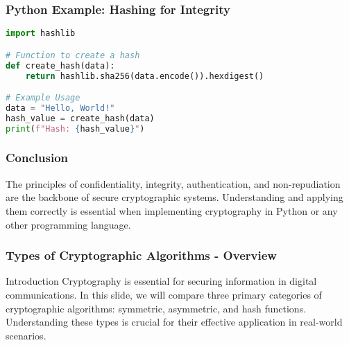 \documentclass{beamer}
\begin{document}
\begin{frame}[fragile]
    \frametitle{Python Example: Hashing for Integrity}
    \begin{lstlisting}[language=Python]
import hashlib

# Function to create a hash
def create_hash(data):
    return hashlib.sha256(data.encode()).hexdigest()

# Example Usage
data = "Hello, World!"
hash_value = create_hash(data)
print(f"Hash: {hash_value}")
    \end{lstlisting}
\end{frame}

\begin{frame}
    \frametitle{Conclusion}
    The principles of confidentiality, integrity, authentication, and non-repudiation 
    are the backbone of secure cryptographic systems. 
    Understanding and applying them correctly is essential when implementing cryptography 
    in Python or any other programming language.
\end{frame}

\begin{frame}[fragile]
    \frametitle{Types of Cryptographic Algorithms - Overview}
    \begin{block}{Introduction}
        Cryptography is essential for securing information in digital communications. 
        In this slide, we will compare three primary categories of cryptographic algorithms:
        symmetric, asymmetric, and hash functions.
        Understanding these types is crucial for their effective application in real-world scenarios.
    \end{block}
\end{frame}
\end{document}
